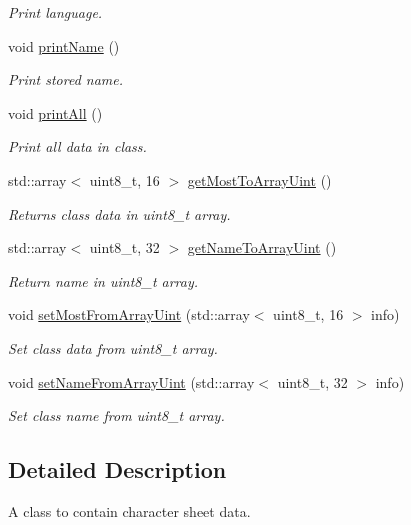 \begin{DoxyCompactItemize}
\begin{DoxyCompactList}\small\item\em Print language. \end{DoxyCompactList}\item 
void \hyperlink{classsheet_a39028f2eb082d2b50bfa05873767de52}{print\+Name} ()
\begin{DoxyCompactList}\small\item\em Print stored name. \end{DoxyCompactList}\item 
void \hyperlink{classsheet_a9689c670d509517bfe17c1b8941aaaaf}{print\+All} ()
\begin{DoxyCompactList}\small\item\em Print all data in class. \end{DoxyCompactList}\item 
std\+::array$<$ uint8\+\_\+t, 16 $>$ \hyperlink{classsheet_a4a9a029a5e816b0c4cb75441f231e2de}{get\+Most\+To\+Array\+Uint} ()
\begin{DoxyCompactList}\small\item\em Returns class data in uint8\+\_\+t array. \end{DoxyCompactList}\item 
std\+::array$<$ uint8\+\_\+t, 32 $>$ \hyperlink{classsheet_a83692af2c0ec0962a3c92e679a8f8648}{get\+Name\+To\+Array\+Uint} ()
\begin{DoxyCompactList}\small\item\em Return name in uint8\+\_\+t array. \end{DoxyCompactList}\item 
void \hyperlink{classsheet_a64845c424dc2e36b3d8268cac104d4b3}{set\+Most\+From\+Array\+Uint} (std\+::array$<$ uint8\+\_\+t, 16 $>$ info)
\begin{DoxyCompactList}\small\item\em Set class data from uint8\+\_\+t array. \end{DoxyCompactList}\item 
void \hyperlink{classsheet_a3d9fc4c4f4cdd28f6d9accffb0037136}{set\+Name\+From\+Array\+Uint} (std\+::array$<$ uint8\+\_\+t, 32 $>$ info)
\begin{DoxyCompactList}\small\item\em Set class name from uint8\+\_\+t array. \end{DoxyCompactList}\end{DoxyCompactItemize}


\subsection{Detailed Description}
A class to contain character sheet data. 

